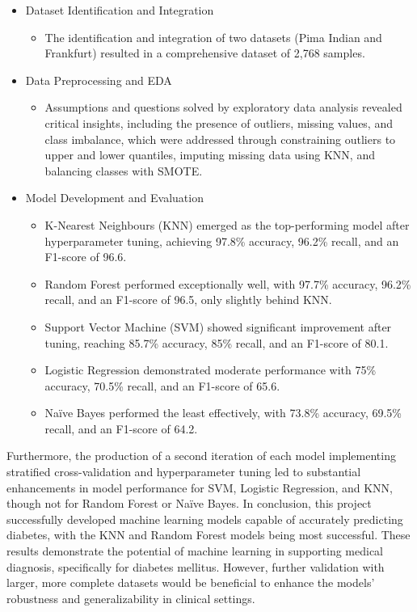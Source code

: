 \documentclass[12pt]{report}
\newcommand{\para}{\vspace{8pt}\noindent}
\begin{document}
\begin{itemize}
    \item Dataset Identification and Integration
    \begin{itemize}
        \item The identification and integration of two datasets (Pima Indian and Frankfurt) resulted in a comprehensive dataset of 2,768 samples. 
    \end{itemize}
    \item Data Preprocessing and EDA
    \begin{itemize}
        \item Assumptions and questions solved by exploratory data analysis revealed critical insights, including the presence of outliers, missing values,
        and class imbalance, which were addressed through constraining outliers to upper and lower quantiles, imputing missing data using KNN, and balancing
        classes with SMOTE.
    \end{itemize}
    \item Model Development and Evaluation
    \begin{itemize}
        \item K-Nearest Neighbours (KNN) emerged as the top-performing model after hyperparameter tuning, achieving 97.8\% accuracy, 96.2\% recall, and an F1-score of 96.6.
        \item Random Forest performed exceptionally well, with 97.7\% accuracy, 96.2\% recall, and an F1-score of 96.5, only slightly behind KNN.
        \item Support Vector Machine (SVM) showed significant improvement after tuning, reaching 85.7\% accuracy, 85\% recall, and an F1-score of 80.1.
        \item Logistic Regression demonstrated moderate performance with 75\% accuracy, 70.5\% recall, and an F1-score of 65.6.
        \item Na\"ive Bayes performed the least effectively, with 73.8\% accuracy, 69.5\% recall, and an F1-score of 64.2.
    \end{itemize}
\end{itemize}

\para Furthermore, the production of a second iteration of each model implementing stratified cross-validation and hyperparameter tuning led to substantial enhancements
in model performance for SVM, Logistic Regression, and KNN, though not for Random Forest or Na\"ive Bayes. In conclusion, this project successfully developed machine
learning models capable of accurately predicting diabetes, with the KNN and Random Forest models being most successful. These results demonstrate the potential of
machine learning in supporting medical diagnosis, specifically for diabetes mellitus. However, further validation with larger, more complete datasets would be beneficial
to enhance the models' robustness and generalizability in clinical settings.
\end{document}
